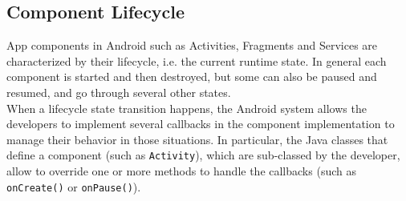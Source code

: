 \documentclass[11pt,a4paper,notitlepage]{article}
\begin{document}
\subsection{Component Lifecycle}
App components in Android such as Activities, Fragments and Services are characterized by their lifecycle, i.e. the current runtime state. In general each component is started and then destroyed, but some can also be paused and resumed, and go through several other states.\medskip \\
When a lifecycle state transition happens, the Android system allows the developers to implement several callbacks in the component implementation to manage their behavior in those situations. In particular, the Java classes that define a component (such as \texttt{Activity}), which are sub-classed by the developer, allow to override one or more methods to handle the callbacks (such as \texttt{onCreate()} or \texttt{onPause()}).
\end{document}
